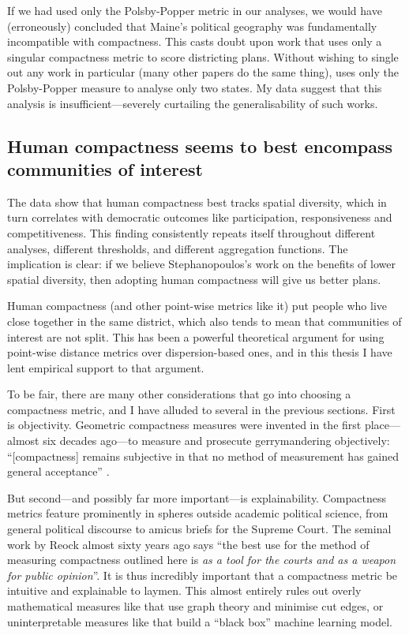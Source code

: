 \documentclass[]{article}
\begin{document}
If we had used only the Polsby-Popper metric in our analyses, we would
have (erroneously) concluded that Maine's political geography was
fundamentally incompatible with compactness. This casts doubt upon work
that uses only a singular compactness metric to score districting plans.
Without wishing to single out any work in particular (many other papers
do the same thing), \cite{s2020} uses only the Polsby-Popper measure to
analyse only two states. My data suggest that this analysis is
insufficient---severely curtailing the generalisability of such works.

\hypertarget{human-compactness-seems-to-best-encompass-communities-of-interest}{%
\subsection{Human compactness seems to best encompass communities of
interest}\label{human-compactness-seems-to-best-encompass-communities-of-interest}}

The data show that human compactness best tracks spatial diversity,
which in turn correlates with democratic outcomes like participation,
responsiveness and competitiveness. This finding consistently repeats
itself throughout different analyses, different thresholds, and
different aggregation functions. The implication is clear: if we believe
Stephanopoulos's work on the benefits of lower spatial diversity, then
adopting human compactness will give us better plans.

Human compactness (and other point-wise metrics like it) put people who
live close together in the same district, which also tends to mean that
communities of interest are not split. This has been a powerful
theoretical argument for using point-wise distance metrics over
dispersion-based ones, and in this thesis I have lent empirical support
to that argument.

To be fair, there are many other considerations that go into choosing a
compactness metric, and I have alluded to several in the previous
sections. First is objectivity. Geometric compactness measures were
invented in the first place---almost six decades ago---to measure and
prosecute gerrymandering objectively: ``{[}compactness{]} remains
subjective in that no method of measurement has gained general
acceptance'' \citep[p.~74]{reock1961}.

But second---and possibly far more important---is explainability.
Compactness metrics feature prominently in spheres outside academic
political science, from general political discourse to amicus briefs for
the Supreme Court. The seminal work by Reock almost sixty years ago says
``the best use for the method of measuring compactness outlined here is
\emph{as a tool for the courts and as a weapon for public opinion}''. It
is thus incredibly important that a compactness metric be intuitive and
explainable to laymen. This almost entirely rules out overly
mathematical measures like \cite{dc2016} that use graph theory and
minimise cut edges, or uninterpretable measures like \cite{kingwp} that
build a ``black box'' machine learning model.
\end{document}
